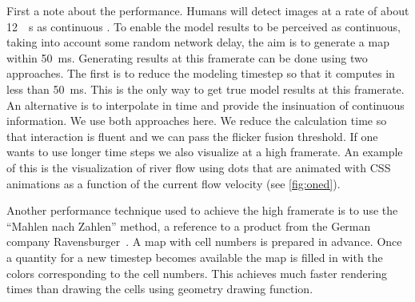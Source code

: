 \documentclass[a4paper]{article}
\begin{document}
First a note about the performance. Humans will detect images at a rate of about \SI{12}{\per\second} as continuous \citep{Landis1954}. To enable the model results to be perceived as continuous, taking into account some random network delay, the aim is to generate a map within \SI{50}{\milli\second}.
Generating results at this framerate can be done using two approaches. The first is to reduce the modeling timestep so that it computes in less than \SI{50}{\milli\second}. This is the only way to get true model results at this framerate.
An alternative is to interpolate in time and provide the insinuation of continuous information.
We use both approaches here. We reduce the calculation time so that interaction is fluent and we can pass the flicker fusion threshold. If one wants to use longer time steps we also visualize at a high framerate. An example of this is the visualization of river flow using dots that are animated with \ac{CSS} animations as a function of the current flow velocity (see \autoref{fig:oned}).

Another performance technique used to achieve the high framerate is to use the ``Mahlen nach Zahlen'' method, a reference to a product from the German company Ravensburger~\textregistered. A map with cell numbers is prepared in advance. Once a quantity for a new timestep becomes available the map is filled in with the colors corresponding to the cell numbers. This achieves much faster rendering times than drawing the cells using geometry drawing function.
\end{document}
